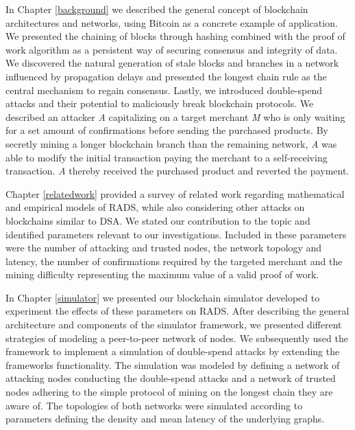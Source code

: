 \documentclass[a4paper,12pt,twoside]{report}
\begin{document}
In Chapter \ref{background} we described the general concept of blockchain architectures and networks, using Bitcoin as a concrete example of application. We presented the chaining of blocks through hashing combined with the proof of work algorithm as a persistent way of securing consensus and integrity of data. We discovered the natural generation of stale blocks and branches in a network influenced by propagation delays and presented the longest chain rule as the central mechanism to regain consensus. Lastly, we introduced double-spend attacks and their potential to maliciously break blockchain protocols. We described an attacker \textit{A} capitalizing on a target merchant \textit{M} who is only waiting for a set amount of confirmations before sending the purchased products. By secretly mining a longer blockchain branch than the remaining network, \textit{A} was able to modify the initial transaction paying the merchant to a self-receiving transaction. \textit{A} thereby received the purchased product and reverted the payment.

Chapter \ref{relatedwork} provided a survey of related work regarding mathematical and empirical models of RADS, while also considering other attacks on blockchains similar to DSA. We stated our contribution to the topic and identified parameters relevant to our investigations. Included in these parameters were the number of attacking and trusted nodes, the network topology and latency, the number of confirmations required by the targeted merchant and the mining difficulty representing the maximum value of a valid proof of work. 

In Chapter \ref{simulator} we presented our blockchain simulator developed to experiment the effects of these parameters on RADS. After describing the general architecture and components of the simulator framework, we presented different strategies of modeling a peer-to-peer network of nodes. We subsequently used the framework to implement a simulation of double-spend attacks by extending the frameworks functionality. The simulation was modeled by defining a network of attacking nodes conducting the double-spend attacks and a network of trusted nodes adhering to the simple protocol of mining on the longest chain they are aware of. The topologies of both networks were simulated according to parameters defining the density and mean latency of the underlying graphs.
\end{document}
